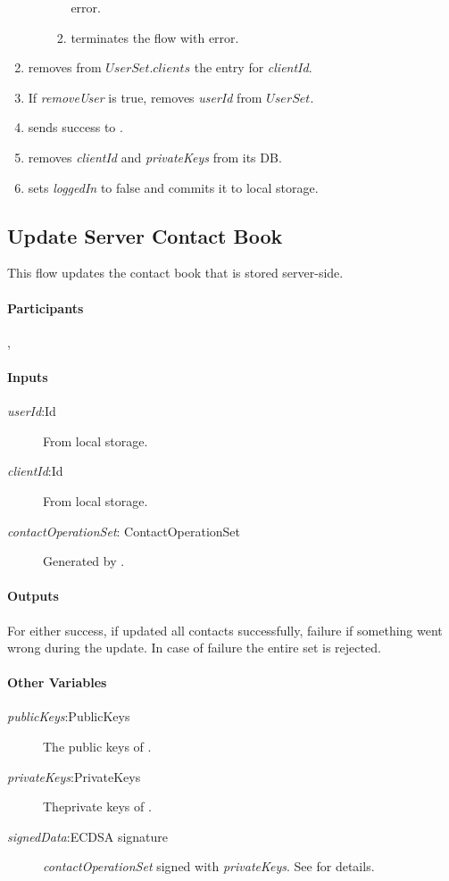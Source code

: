 \documentclass[a4paper,10pt]{article}
\newcommand{\signedData}{\emph{signedData}}
\newcommand{\privateKeys}{\emph{privateKeys}}
\newcommand{\publicKeys}{\emph{publicKeys}}
\newcommand{\userId}{\emph{userId}}
\newcommand{\clientId}{\emph{clientId}}
\newcommand{\loggedIn}{\emph{loggedIn}}
\newcommand{\removeUser}{\emph{removeUser}}
\newcommand{\contactOperationSet}{\emph{contactOperationSet}}
\begin{document}
\begin{enumerate}
\begin{enumerate}
\begin{enumerate}
error.
   \item \Client{} terminates the flow with error.
  \end{enumerate}
 \end{enumerate}
 \item\label{delete_client:first} \Server{} removes from $UserSet.clients$ the 
entry for \clientId{}.
 \item If \removeUser{} is true, \Server{} removes \userId{} from $UserSet$.
 \item \Server{} sends success to \Client{}.
 \item \Client{} removes \clientId{} and \privateKeys{} from its DB.
 \item \Client{} sets \loggedIn{} to false and commits it to local storage.
\end{enumerate}

\subsection{Update Server Contact Book}
This flow updates the contact book that is stored server-side.

\paragraph{Participants} \Client{}, \Server{}

\paragraph{Inputs}
\SpecialItem
\begin{description}
 \item[\userId{}:Id] From \Client{} local storage.
 \item[\clientId{}:Id] From \Client{} local storage.
 \item[\contactOperationSet{}: ContactOperationSet] Generated by \Client{}.
\end{description}

\paragraph{Outputs}
For \Client{} either success, if \Server{} updated all contacts successfully, failure if something went wrong during the update. In case of failure the entire set is rejected.

\paragraph{Other Variables}
\SpecialItem
\begin{description}
 \item[\publicKeys{}:PublicKeys] The public keys of  \Client{}. 
 \item[\privateKeys{}:PrivateKeys] Theprivate keys of \Client{}.
 \item[\signedData{}:ECDSA signature] \contactOperationSet{} signed with
\privateKeys{}. See \cite{crypto_spec} for details.
\end{description}
\end{document}
